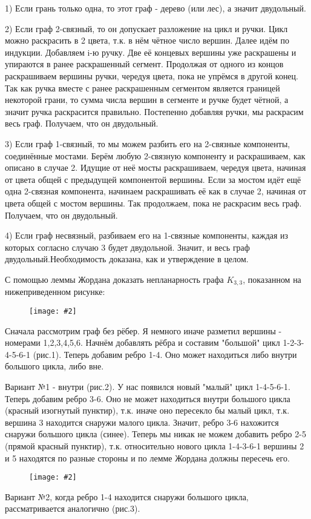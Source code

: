 \documentclass[a4paper,12pt]{article}
\numberwithin{figure}{section}
\newcommand\CenterFigure[2]{\begin{figure}[H]\centering\texttt{[image: \#2]}\end{figure}}
\begin{document}
\begin{solution}
	1) Если грань только одна, то этот граф - дерево (или лес), а значит двудольный.
	
	2) Если граф 2-связный, то он допускает разложение на цикл и ручки. Цикл можно раскрасить в 2 цвета, т.к. в нём чётное число вершин. Далее идём по индукции. Добавляем i-ю ручку. Две её концевых вершины уже раскрашены и упираются в ранее раскрашенный сегмент. Продолжая от одного из концов раскрашиваем вершины ручки, чередуя цвета, пока не упрёмся в другой конец. Так как ручка вместе с ранее раскрашенным сегментом является границей некоторой грани, то сумма числа вершин в сегменте и ручке будет чётной, а значит ручка раскрасится правильно. Постепенно добавляя ручки, мы раскрасим весь граф. Получаем, что он двудольный.
	
	3) Если граф 1-связный, то мы можем разбить его на 2-связные компоненты, соединённые мостами. Берём любую 2-связную компоненту и раскрашиваем, как описано в случае 2. Идущие от неё мосты раскрашиваем, чередуя цвета, начиная от цвета общей с предыдущей компонентой вершины. Если за мостом идёт ещё одна 2-связная компонента, начинаем раскрашивать её как в случае 2, начиная от цвета общей с мостом вершины. Так продолжаем, пока не раскрасим весь граф. Получаем, что он двудольный.
	
	4) Если граф несвязный, разбиваем его на 1-связные компоненты, каждая из которых согласно случаю 3 будет двудольной. Значит, и весь граф двудольный.Необходимость доказана, как и утверждение в целом.
\end{solution}


\begin{problem}
	С помощью леммы Жордана доказать непланарность графа $K_{3,3}$, показанном на нижеприведенном рисунке:
		\CenterFigure{4cm}{planar1-step10-why-k33-nonplanar.png}
\end{problem}
\begin{solution}
	Сначала рассмотрим граф без рёбер. Я немного иначе разметил вершины - номерами 1,2,3,4,5,6. Начнём добавлять рёбра и составим "большой" цикл 1-2-3-4-5-6-1 (рис.1). Теперь добавим ребро 1-4. Оно может находиться либо внутри большого цикла, либо вне.
	
	Вариант №1 - внутри (рис.2). У нас появился новый "малый" цикл 1-4-5-6-1. Теперь добавим ребро 3-6. Оно не может находиться внутри большого цикла (красный изогнутый пунктир), т.к. иначе оно пересекло бы малый цикл, т.к. вершина 3 находится снаружи малого цикла. Значит, ребро 3-6 нахожится снаружи большого цикла (синее). Теперь мы никак не можем добавить ребро 2-5 (прямой красный пунктир), т.к. относительно нового цикла 1-4-3-6-1 вершины 2 и 5 находятся по разные стороны и по лемме Жордана должны пересечь его.
		\CenterFigure{14cm}{planar1-step10-solution.png}
	Вариант №2, когда ребро 1-4 находится снаружи большого цикла, рассматривается аналогично (рис.3).
\end{solution}
\end{document}
